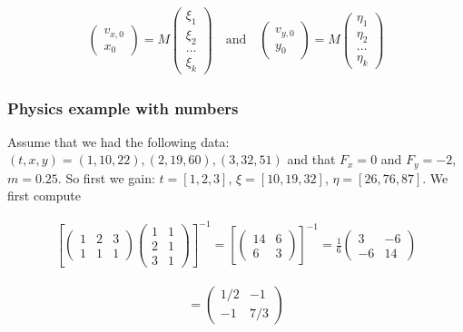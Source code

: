 \[\begin{aligned}
\begin{pmatrix}  v_{x,0} \\ x_0 \end{pmatrix} =  M  \begin{pmatrix} \xi_1 \\ \xi_2 \\ \dots \\ \xi_k \end{pmatrix}
\quad \mbox{and}
\quad
\begin{pmatrix}  v_{y,0} \\ y_0 \end{pmatrix} =
M \begin{pmatrix} \eta_1 \\ \eta_2 \\ \dots \\ \eta_k \end{pmatrix}
\end{aligned}\]

\hypertarget{physics-example-with-numbers}{%
\subsubsection{Physics example with
numbers}\label{physics-example-with-numbers}}

Assume that we had the following data:
\((t,x,y) =  (1, 10, 22), (2, 19, 60), (3, 32,
51)\) and that \(F_x=0\) and \(F_y = -2\), \(m=0.25\). So first we gain:
\(t = [1, 2, 3]\), \(\xi = [10, 19, 32]\), \(\eta = [26, 76, 87]\). We
first compute

\[\begin{aligned}
\left[\begin{pmatrix} 1 & 2 &  3  \\ 1 & 1 & 1\end{pmatrix} \begin{pmatrix} 1 & 1 \\ 2 & 1  \\ 3 & 1 \end{pmatrix} \right]^{-1}
= \left[\begin{pmatrix} 14 & 6 \\ 6 & 3 \end{pmatrix}\right]^{-1} =  \frac{1}{6} \begin{pmatrix} 3 & -6 \\ -6 & 14 \end{pmatrix}
\end{aligned}\]

\[\begin{aligned}
= \begin{pmatrix} 1/2 & -1 \\ -1 & 7/3 \end{pmatrix}
\end{aligned}\]

